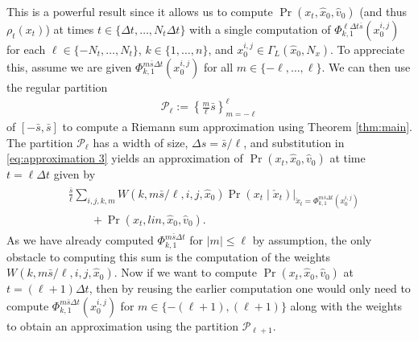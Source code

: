 \documentclass[letterpaper,10pt,conference]{ieeeconf}
\begin{document}
This is a powerful result since it allows us to compute $\Pr( x_t, \hat{x}_0, \hat{v}_0)$  (and thus $\rho_t(x_t)$) at times $t \in \{\Delta t, \dots, N_t \Delta t\}$ with a single computation of $\Phi_{k,1}^{\ell \Delta t \bar{s}}( x_0^{i,j})$ for each $\ell \in  \{-N_t,\dots,N_t\}$, $k \in \{1,\dots,n\}$, and $x_0^{i,j} \in \Gamma_L( \hat{x}_0 , N_x)$.
To appreciate this, assume we are given $\Phi_{k,1}^{m  \bar{s} \Delta t}(x_0^{i,j})$ for all $m \in \{ -\ell, \ldots, \ell \}$.
We can then use the regular partition
\begin{align}
	\mathcal{P}_\ell := \left\{ \frac{m}{\ell} \bar{s} \right\}_{m=-\ell}^{\ell} \label{eq:partition}
\end{align}
of $[-\bar{s}, \bar{s}]$ to compute a Riemann sum approximation using Theorem \ref{thm:main}.
The partition $\mathcal{P}_\ell$ has a width of size, $\Delta s = \bar{s} / \ell$, and substitution in \eqref{eq:approximation 3} yields an approximation of $\Pr( x_t, \hat{x}_0, \hat{v}_0)$ at time $t=\ell \Delta t$
given by
\begin{align*}
	\begin{split}
		&\frac{\bar{s}}{\ell} \sum_{i,j,k,m} W(k,m \bar{s} / \ell ,i,j,\hat{x}_0) \left. \Pr( x_t \mid \check{x}_t ) \right|_{ \check{x}_t = \Phi_{k,1}^{m \bar{s} \Delta t}( x_0^{i,j}) } \\
		&\qquad+\Pr( x_t , lin, \hat{x}_0, \hat{v}_0 ).
	\end{split}
\end{align*}
As we have already computed $\Phi_{k,1}^{m \bar{s} \Delta t}$ for $| m | \leq \ell$ by assumption, the only obstacle to computing this sum is the computation of the weights $W(k,m \bar{s} / \ell ,i,j,\hat{x}_0)$.
Now if we want to compute $\Pr( x_t, \hat{x}_0, \hat{v}_0)$ at $t=(\ell + 1 ) \Delta t$, then by reusing the earlier computation one would only need to compute $\Phi_{k,1}^{m  \bar{s} \Delta t}(x_0^{i,j})$ for $m \in \{ -( \ell + 1 ), (\ell + 1 )\}$ along with the weights to obtain an approximation using the partition $\mathcal{P}_{\ell + 1}$.
\end{document}
